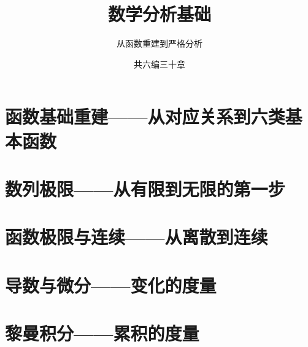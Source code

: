 \documentclass[12pt,a4paper,openany]{ctexbook}
\title{\Huge 数学分析基础}
\author{\large 从函数重建到严格分析}
\date{\large 共六编三十章}
\begin{document}
\maketitle
\tableofcontents
\newpage

\part{函数基础重建——从对应关系到六类基本函数}










\part{数列极限——从有限到无限的第一步}





\part{函数极限与连续——从离散到连续}





\part{导数与微分——变化的度量}






\part{黎曼积分——累积的度量}




\end{document}
